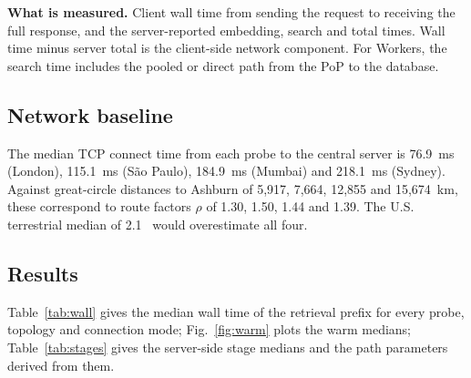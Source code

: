 \documentclass[conference]{IEEEtran}
\begin{document}
\textbf{What is measured.} Client wall time from sending the request to receiving the full
response, and the server-reported embedding, search and total times. Wall time minus server total
is the client-side network component. For Workers, the search time includes the pooled or direct
path from the PoP to the database.

\subsection{Network baseline}\label{sec:netbase}
The median TCP connect time from each probe to the central server is 76.9~ms (London), 115.1~ms
(S\~ao Paulo), 184.9~ms (Mumbai) and 218.1~ms (Sydney). Against great-circle distances to Ashburn
of 5{,}917, 7{,}664, 12{,}855 and 15{,}674~km, these correspond to route factors $\rho$ of 1.30,
1.50, 1.44 and 1.39. The U.S. terrestrial median of 2.1~\cite{bozkurt2018} would overestimate all
four.

\subsection{Results}
Table~\ref{tab:wall} gives the median wall time of the retrieval prefix for every probe, topology
and connection mode; Fig.~\ref{fig:warm} plots the warm medians; Table~\ref{tab:stages} gives the
server-side stage medians and the path parameters derived from them.
\end{document}
